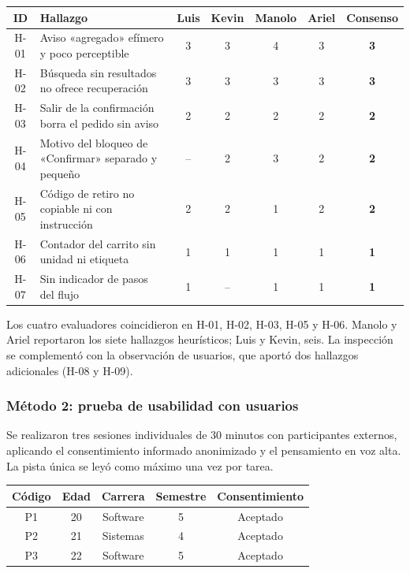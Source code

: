 \documentclass{article}
\begin{document}
\begin{center}
\small
\begin{tabular}{|c|p{5.4cm}|c|c|c|c|c|}
\hline
\textbf{ID} & \textbf{Hallazgo} & \textbf{Luis} & \textbf{Kevin} & \textbf{Manolo} & \textbf{Ariel} & \textbf{Consenso} \\
\hline
H-01 & Aviso «agregado» efímero y poco perceptible & 3 & 3 & 4 & 3 & \textbf{3} \\
\hline
H-02 & Búsqueda sin resultados no ofrece recuperación & 3 & 3 & 3 & 3 & \textbf{3} \\
\hline
H-03 & Salir de la confirmación borra el pedido sin aviso & 2 & 2 & 2 & 2 & \textbf{2} \\
\hline
H-04 & Motivo del bloqueo de «Confirmar» separado y pequeño & -- & 2 & 3 & 2 & \textbf{2} \\
\hline
H-05 & Código de retiro no copiable ni con instrucción & 2 & 2 & 1 & 2 & \textbf{2} \\
\hline
H-06 & Contador del carrito sin unidad ni etiqueta & 1 & 1 & 1 & 1 & \textbf{1} \\
\hline
H-07 & Sin indicador de pasos del flujo & 1 & -- & 1 & 1 & \textbf{1} \\
\hline
\end{tabular}
\end{center}

Los cuatro evaluadores coincidieron en H-01, H-02, H-03, H-05 y H-06. Manolo y Ariel reportaron los siete hallazgos heurísticos; Luis y Kevin, seis. La inspección se complementó con la observación de usuarios, que aportó dos hallazgos adicionales (H-08 y H-09).

\subsubsection{Método 2: prueba de usabilidad con usuarios}
Se realizaron tres sesiones individuales de 30 minutos con participantes externos, aplicando el consentimiento informado anonimizado y el pensamiento en voz alta. La pista única se leyó como máximo una vez por tarea.

\begin{center}
\small
\begin{tabular}{|c|c|c|c|c|}
\hline
\textbf{Código} & \textbf{Edad} & \textbf{Carrera} & \textbf{Semestre} & \textbf{Consentimiento} \\
\hline
P1 & 20 & Software & 5 & Aceptado \\
\hline
P2 & 21 & Sistemas & 4 & Aceptado \\
\hline
P3 & 22 & Software & 5 & Aceptado \\
\hline
\end{tabular}
\end{center}
\end{document}
